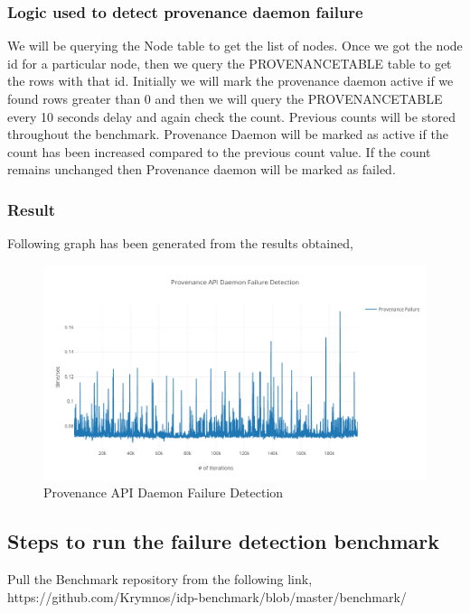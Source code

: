 \subsubsection{Logic used to detect provenance daemon failure}

We will be querying the Node table to get the list of nodes. Once we got the node id for a particular node, then we query the PROVENANCETABLE table to get the rows with that id. Initially we will mark the provenance daemon active if we found rows greater than 0 and then we will query the PROVENANCETABLE every 10 seconds delay and again check the count. Previous counts will be stored throughout the benchmark. Provenance Daemon will be marked as active if the count has been increased compared to the previous count value. If the count remains unchanged then Provenance daemon will be marked as failed.

\subsubsection{Result}

Following graph has been generated from the results obtained,

\begin{figure}[H]
	\center
	\includegraphics[width=1\textwidth]{figures/benchmark_provenance.png}
	\caption{Provenance API Daemon Failure Detection}
	\label{fig:benchmark_provenance}
\end{figure}


\subsection{Steps to run the failure detection benchmark}


Pull the Benchmark repository from the following link,
https://github.com/Krymnos/idp-benchmark/blob/master/benchmark/

